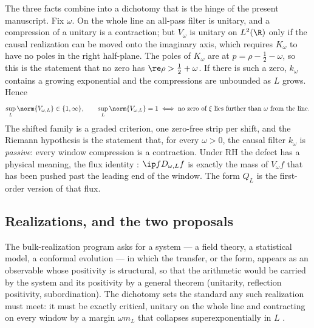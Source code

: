 The three facts combine into a dichotomy \cite[Proposition~7.2]{WilsonLines}
that is the hinge of the present manuscript. Fix $\omega$. On the whole line an
all-pass filter is unitary, and a compression of a unitary is a contraction; but
$V_\omega$ is unitary on $L^2(\R)$ only if the causal realization can be moved
onto the imaginary axis, which requires $K_\omega$ to have no poles in the right
half-plane. The poles of $K_\omega$ are at $p=\rho-\frac12-\omega$, so this is
the statement that no zero has $\re\rho>\frac12+\omega$. If there is such a
zero, $k_\omega$ contains a growing exponential and the compressions are
unbounded as $L$ grows. Hence
\begin{equation}\label{eq:intro-dichotomy}
 \sup_L\norm{V_{\omega,L}}\in\{1,\infty\},\qquad
 \sup_L\norm{V_{\omega,L}}=1\iff\text{no zero of $\xi$ lies further than $\omega$ from the line.}
\end{equation}
The shifted family is a graded criterion, one zero-free strip per shift, and
the Riemann hypothesis is the statement that, for every $\omega>0$, the causal
filter $k_\omega$ is \emph{passive}: every window compression is a contraction.
Under RH the defect has a physical meaning, the flux identity
\cite[Proposition~4.5]{WilsonLines}: $\ip f{D_{\omega,L}f}$ is exactly the mass
of $V_\omega f$ that has been pushed past the leading end of the window. The
form $Q_L$ is the first-order version of that flux.

\subsection{Realizations, and the two proposals}

The bulk-realization program asks for a system --- a field theory, a
statistical model, a conformal evolution --- in which the transfer, or the
form, appears as an observable whose positivity is structural, so that the
arithmetic would be carried by the system and its positivity by a general
theorem (unitarity, reflection positivity, subordination). The dichotomy sets
the standard any such realization must meet: it must be exactly critical,
unitary on the whole line and contracting on every window by a margin
$\omega m_L$ that collapses superexponentially in $L$ \cite[Section~8]{WilsonLines}.

